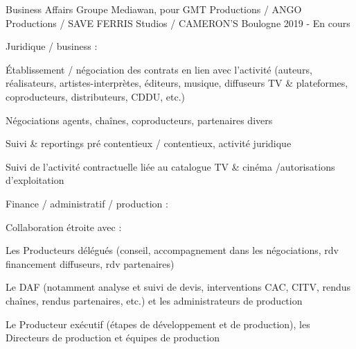 
\begin{cventries}

  \cventry
    {Business Affairs} %
    {Groupe Mediawan, pour GMT Productions / ANGO Productions / SAVE FERRIS Studios / CAMERON’S} %
    {Boulogne} %
    {2019 - En cours} %
    {
      \begin{cvitems} %
        \item {Juridique / business :}
        \begin{cvsubitems}
          \item {Établissement / négociation des contrats en lien avec l’activité (auteurs, réalisateurs, artistes-interprètes, éditeurs, musique, diffuseurs TV \& plateformes, coproducteurs, distributeurs, CDDU, etc.)}
          \item {Négociations agents, chaînes, coproducteurs, partenaires divers}
          \item {Suivi \& reportings pré contentieux / contentieux, activité juridique}
          \item {Suivi de l’activité contractuelle liée au catalogue TV \& cinéma /autorisations d’exploitation}
        \end{cvsubitems}
        \item {Finance / administratif / production :}
        \begin{cvsubitems}
          \item {Collaboration étroite avec :}
          \begin{cvsubsubitems}
            \item {Les Producteurs délégués (conseil, accompagnement dans les négociations, rdv financement diffuseurs, rdv partenaires)}
            \item {Le DAF (notamment analyse et suivi de devis, interventions CAC, CITV, rendus chaînes, rendus partenaires, etc.) et les \newline administrateurs de production}
            \item {Le Producteur exécutif (étapes de développement et de production), les Directeurs de production et équipes de production}

\end{cvsubsubitems}
\end{cvsubitems}
\end{cvitems}}
\end{cventries}
